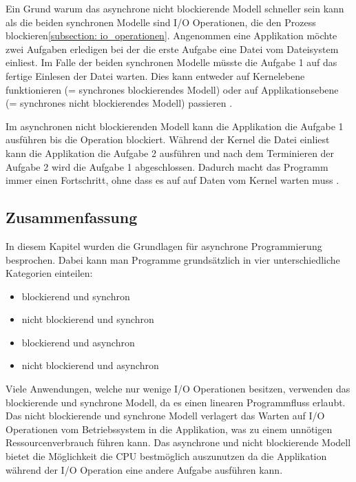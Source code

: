 Ein Grund warum das asynchrone nicht blockierende Modell schneller sein kann als die beiden synchronen Modelle sind I/O Operationen, die den Prozess blockieren\ref{subsection: io_operationen}. Angenommen eine Applikation möchte zwei Aufgaben erledigen bei der die erste Aufgabe eine Datei vom Dateisystem einliest. Im Falle der beiden synchronen Modelle müsste die Aufgabe 1 auf das fertige Einlesen der Datei warten. Dies kann entweder auf Kernelebene funktionieren (= synchrones blockierendes Modell) oder auf Applikationsebene (= synchrones nicht blockierendes Modell) passieren \cite[]{Pet2015}. 

Im asynchronen nicht blockierenden Modell kann die Applikation die Aufgabe 1 ausführen bis die Operation blockiert. Während der Kernel die Datei einliest kann die Applikation die Aufgabe 2 ausführen und nach dem Terminieren der Aufgabe 2 wird die Aufgabe 1 abgeschlossen. Dadurch macht das Programm immer einen Fortschritt, ohne dass es auf auf Daten vom Kernel warten muss \cite[]{Pet2015}.


\subsection{Zusammenfassung}

In diesem Kapitel wurden die Grundlagen für asynchrone Programmierung besprochen. Dabei kann man Programme grundsätzlich in vier unterschiedliche Kategorien einteilen:

\begin{itemize}
  \item blockierend und synchron
  \item nicht blockierend und synchron
  \item blockierend und asynchron
  \item nicht blockierend und asynchron
\end{itemize}

Viele Anwendungen, welche nur wenige I/O Operationen besitzen, verwenden das blockierende und synchrone Modell, da es einen linearen Programmfluss erlaubt. Das nicht blockierende und synchrone Modell verlagert das Warten auf I/O Operationen vom Betriebssystem in die Applikation, was zu einem unnötigen Ressourcenverbrauch führen kann. Das asynchrone und nicht blockierende Modell bietet die Möglichkeit die CPU bestmöglich auszunutzen da die Applikation während der I/O Operation eine andere Aufgabe ausführen kann.